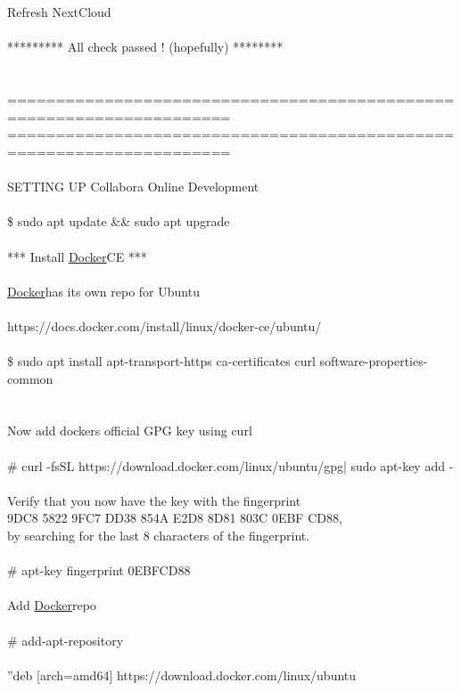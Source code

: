 \documentclass[10pt,a4paper]{article}
\begin{document}
{\\
	\\
	Refresh NextCloud\\
\\
	********* All check passed !  (hopefully) ********\\
\\
\\
=====================================================================\\
=====================================================================\\
\\
SETTING UP Collabora Online Development \\
\\
\$ sudo apt update \&\& sudo apt upgrade\\
\\
*** Install \hyperlink{docker}{Docker}}{\large  CE ***\\
\\
	\hyperlink{docker}{Docker}}{\large  has its own repo for Ubuntu\\
\\
	https://docs.docker.com/install/linux/docker-ce/ubuntu/}{\large \\
\\
	\$ sudo apt install apt-transport-https ca-certificates curl software-properties-common\\
\\
\\
	Now add dockers official GPG key using curl\\
\\
	\# curl -fsSL https://download.docker.com/linux/ubuntu/gpg}{\large  | sudo apt-key add -\\
\\
	Verify that you now have the key with the fingerprint \\
	9DC8 5822 9FC7 DD38 854A E2D8 8D81 803C 0EBF CD88, \\
	by searching for the last 8 characters of the fingerprint.\\
\\
	\# apt-key fingerprint 0EBFCD88\\
\\
	Add \hyperlink{docker}{Docker}}{\large  repo\\
\\
	\# add-apt-repository \\\\
   	''deb [arch=amd64] https://download.docker.com/linux/ubuntu}{\large  \\\\
}
\end{document}
